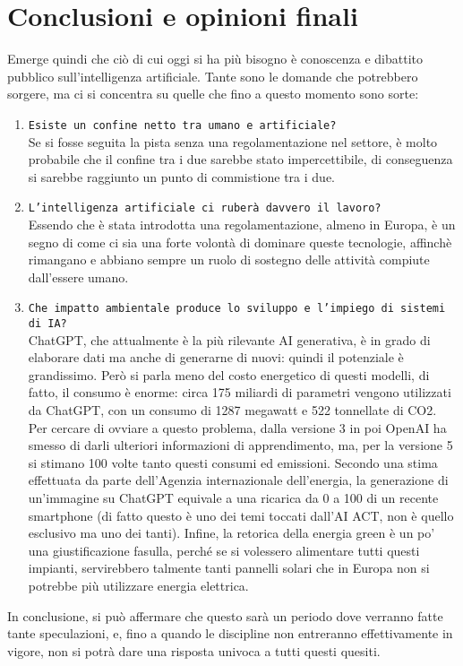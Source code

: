 \documentclass{article}
\begin{document}
\centering
\section{Conclusioni e opinioni finali}
\begin{justify}
   Emerge quindi che ciò di cui oggi si ha più bisogno è conoscenza e dibattito pubblico sull'intelligenza artificiale. Tante sono le domande che potrebbero sorgere, ma ci si concentra su quelle che fino a questo momento sono sorte:
   \begin{enumerate}
       \item \texttt{Esiste un confine netto tra umano e artificiale?}\\
       Se si fosse seguita la pista senza una regolamentazione nel settore, è molto probabile che il confine tra i due sarebbe stato impercettibile, di conseguenza si sarebbe raggiunto un punto di commistione tra i due.
       \item \texttt{L’intelligenza artificiale ci ruberà davvero il lavoro?}\\
       Essendo che è stata introdotta una regolamentazione, almeno in Europa, è un segno di come ci sia una forte volontà di dominare queste tecnologie, affinchè rimangano e abbiano sempre un ruolo di sostegno delle attività compiute dall'essere umano.
       \item \texttt{Che impatto ambientale produce lo sviluppo e l'impiego di sistemi di IA?}\\
       ChatGPT, che attualmente è la più rilevante AI generativa, è in grado di elaborare dati ma anche di generarne di nuovi: quindi il potenziale è grandissimo. Però si parla meno del costo energetico di questi modelli, di fatto, il consumo è enorme: circa 175 miliardi di parametri vengono utilizzati da ChatGPT, con un consumo di 1287 megawatt e 522 tonnellate di CO2. Per cercare di ovviare a questo problema, dalla versione 3 in poi OpenAI ha smesso di darli ulteriori informazioni di apprendimento, ma, per la versione 5 si stimano 100 volte tanto questi consumi ed emissioni.
       Secondo una stima effettuata da parte dell'Agenzia internazionale dell'energia, la generazione di un’immagine su ChatGPT equivale a una ricarica da 0 a 100 di un recente smartphone (di fatto questo è uno dei temi toccati dall’AI ACT, non è quello esclusivo ma uno dei tanti).
       Infine, la retorica della energia green è un po’ una giustificazione fasulla, perché se si volessero alimentare tutti questi impianti, servirebbero talmente tanti pannelli solari che in Europa non si potrebbe più utilizzare energia elettrica.\citep{nast_se_2023}
   \end{enumerate}
   In conclusione, si può affermare che questo sarà un periodo dove verranno fatte tante speculazioni, e, fino a quando le discipline non entreranno effettivamente in vigore, non si potrà dare una risposta univoca a tutti questi quesiti.
\end{justify}

\begin{justify}
    
    
\end{justify}
\end{document}

